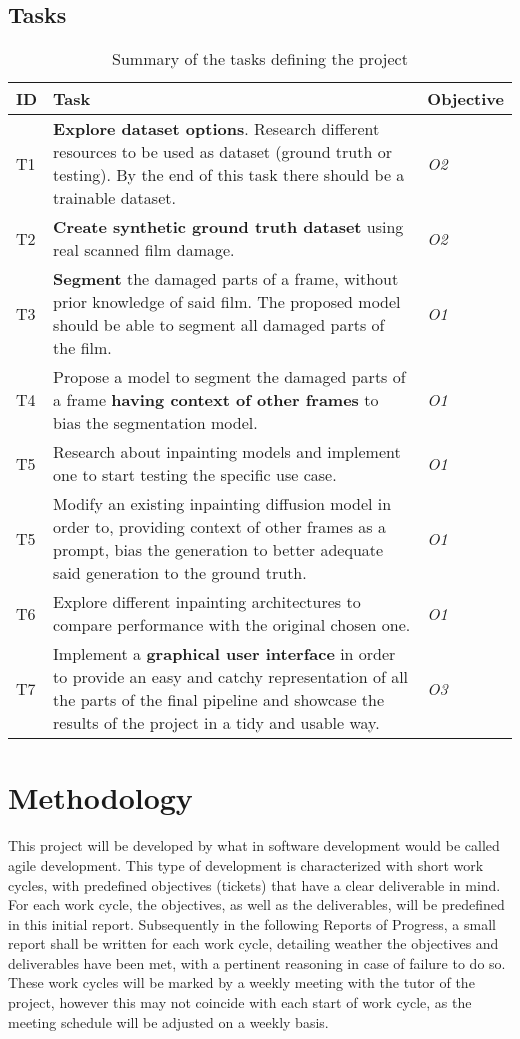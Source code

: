 \documentclass[openany, 12pt]{article}
\begin{document}
	\subsection{Tasks}
	\setlength{\arrayrulewidth}{.7 pt}
	\begin{table}[ht]
		\small
		\centering
		\begin{tabular}{|I|O|M|}
			\hline
			\textbf{ID} & \textbf{Task} & \textbf{Objective}\\ \hline
			T1 & \textbf{Explore dataset options}. Research different resources to be used as dataset (ground truth or testing). By the end of this task there should be a trainable dataset. & \textit{O2} \\ \hline
			T2 & \textbf{Create synthetic ground truth dataset} using real scanned film damage. &\textit{O2} \\ \hline 
			T3 & \textbf{Segment} the damaged parts of a frame, without prior knowledge of said film. The proposed model should be able to segment all damaged parts of the film. & \textit{O1}\\ \hline
			T4 & Propose a model to segment the damaged parts of a frame \textbf{having context of other frames} to bias the segmentation model. & \textit{O1} \\ \hline
			T5 & Research about inpainting models and implement one to start testing the specific use case. & \textit{O1} \\ \hline
			T5 & Modify an existing inpainting diffusion model in order to, providing context of other frames as a prompt, bias the generation to better adequate said generation to the ground truth.  & \textit{O1} \\ \hline
			T6 & Explore different inpainting architectures to compare performance with the original chosen one.  & \textit{O1} \\ \hline
			T7 & Implement a \textbf{graphical user interface} in order to provide an easy and catchy representation of all the parts of the final pipeline and showcase the results of the project in a tidy and usable way.  & \textit{O3}\\ \hline
		\end{tabular}
		\caption{Summary of the tasks defining the project}
	\end{table}
	\newpage
	\section{Methodology}
	This project will be developed by what in software development would be called agile development. This type of development is characterized with short work cycles, with predefined objectives (tickets) that have a clear deliverable in mind. For each work cycle, the objectives, as well as the deliverables, will be predefined in this initial report. Subsequently in the following Reports of Progress, a small report shall be written for each work cycle, detailing weather the objectives and deliverables have been met, with a pertinent reasoning in case of failure to do so. 
	These work cycles will be marked by a weekly meeting with the tutor of the project, however this may not coincide with each start of work cycle, as the meeting schedule will be adjusted on a weekly basis. 
\end{document}
